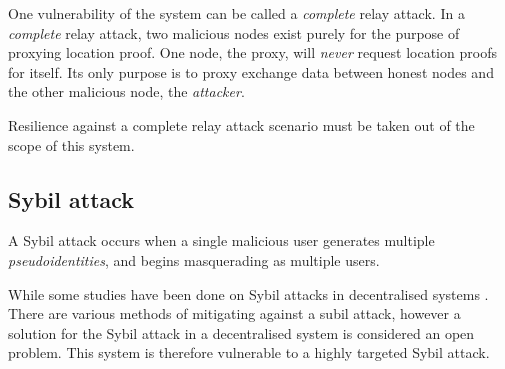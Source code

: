 One vulnerability of the system can be called a \textit{complete} relay attack. In a \textit{complete} relay attack, two malicious nodes exist purely for the purpose of proxying location proof. One node, the proxy, will \textit{never} request location proofs for itself. Its only purpose is to proxy exchange data between honest nodes and the other malicious node, the \textit{attacker}.

Resilience against a complete relay attack scenario must be taken out of the scope of this system. 

\subsection{Sybil attack}
A Sybil attack occurs when a single malicious user generates multiple \textit{pseudoidentities}, and begins masquerading as multiple users.

While some studies have been done on Sybil attacks in decentralised systems \cite{sybil}. There are various methods of mitigating against a subil attack, however a solution for the Sybil attack in a decentralised system is considered an open problem. This system is therefore vulnerable to a highly targeted Sybil attack.

